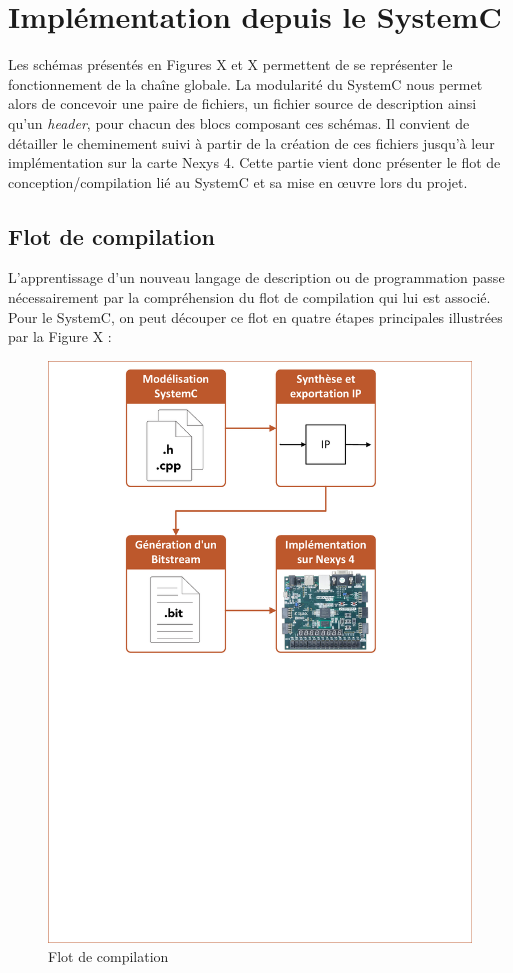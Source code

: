 \documentclass[a4paper,12pt]{article}
\begin{document}
\section{Implémentation depuis le SystemC}
	Les schémas présentés en Figures X et X permettent de se représenter le fonctionnement de la chaîne globale. La modularité du SystemC nous permet alors de concevoir une paire de fichiers, un fichier source de description ainsi qu'un \textit{header}, pour chacun des blocs composant ces schémas. Il convient de détailler le cheminement suivi à partir de la création de ces fichiers jusqu'à leur implémentation sur la carte Nexys 4. Cette partie vient donc présenter le flot de conception/compilation lié au SystemC et sa mise en œuvre lors du projet.

\subsection{Flot de compilation}
	L'apprentissage d'un nouveau langage de description ou de programmation passe nécessairement par la compréhension du flot de compilation qui lui est associé. Pour le SystemC, on peut découper ce flot en quatre étapes principales illustrées par la Figure X :
	\begin{figure}[H]
		\centering
		\includegraphics[scale=0.5, keepaspectratio]{Dessin2.pdf}
		\caption{Flot de compilation}
	\end{figure}
\end{document}
